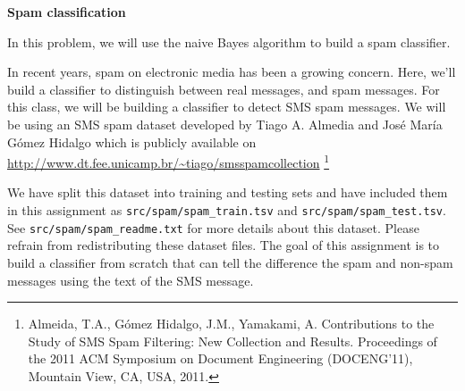 \item {} {\bf Spam classification}

In this problem, we will use the naive Bayes algorithm to
build a spam classifier.

In recent years, spam on electronic media has been a growing concern.  Here, we'll build a classifier to distinguish
between real messages, and spam messages. For this class, we will be building a classifier to detect SMS spam messages. We will be using an SMS spam dataset developed by Tiago A. Almedia and José María Gómez Hidalgo which is publicly available on \url{http://www.dt.fee.unicamp.br/~tiago/smsspamcollection} \footnote{Almeida, T.A., Gómez Hidalgo, J.M., Yamakami, A. Contributions to the Study of SMS Spam Filtering: New Collection and Results.  Proceedings of the 2011 ACM Symposium on Document Engineering (DOCENG'11), Mountain View, CA, USA, 2011.}

We have split this dataset into training and testing sets and have included them in this assignment as \texttt{src/spam/spam\_train.tsv} and \texttt{src/spam/spam\_test.tsv}. See \texttt{src/spam/spam\_readme.txt} for more details about this dataset. Please refrain from redistributing these dataset files. The goal of this assignment is to build a classifier from scratch that can tell the difference the spam and non-spam messages using the text of the SMS message.

\begin{enumerate}
  
  \ifnum{} {
    
  } \fi

  
  \ifnum{} {
    
  } \fi

  
  \ifnum{} {
    
  } \fi
\end{enumerate}
